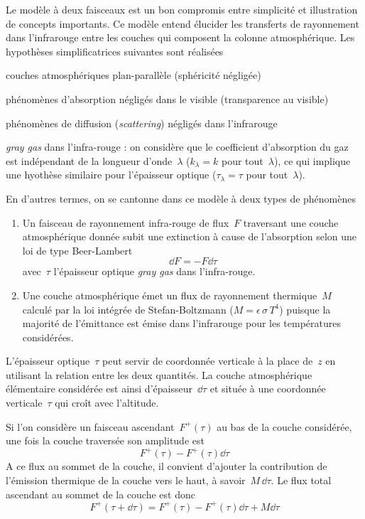 \sk
Le modèle à deux faisceaux est un bon compromis entre simplicité
et illustration de concepts importants. Ce modèle entend élucider
les transferts de rayonnement dans l'infrarouge entre
les couches qui composent la colonne atmosphérique. Les
hypothèses simplificatrices suivantes sont réalisées
\begin{citemize}
\item couches atmosphériques plan-parallèle (sphéricité négligée)
\item phénomènes d'absorption négligés dans le visible (transparence au visible)
\item phénomènes de diffusion (\emph{scattering}) négligés dans l'infrarouge
\item \emph{gray gas} dans l'infra-rouge : on considère que le coefficient d'absorption
du gaz est indépendant de la longueur d'onde~$\lambda$ ($k_{\lambda} = k$ pour tout~$\lambda$),
ce qui implique une hyothèse similaire pour l'épaisseur optique ($\tau_{\lambda} = \tau$ pour tout~$\lambda$).
\end{citemize}
En d'autres termes, on se cantonne dans ce modèle à deux types de phénomènes
\begin{enumerate}
\item Un faisceau de rayonnement infra-rouge de flux~$F$ traversant une couche 
atmosphérique donnée
subit une extinction à cause de l'absorption selon une loi de type Beer-Lambert
\[
\dd F = - F \dd \tau
\]
avec~$\tau$ l'épaisseur optique \emph{gray gas} 
dans l'infra-rouge.
\item Une couche atmosphérique émet un flux de rayonnement thermique~$M$ 
calculé par la loi intégrée de Stefan-Boltzmann ($M=\epsilon\,\sigma\,T^4$)
puisque la majorité de l'émittance est émise dans l'infrarouge pour les températures considérées.
\end{enumerate}

\sk
L'épaisseur optique~$\tau$ peut servir de coordonnée verticale à la place de~$z$
en utilisant la relation entre les deux quantités. La couche atmosphérique
élémentaire considérée est ainsi d'épaisseur~$\dd\tau$ et située à une coordonnée
verticale~$\tau$ qui croît avec l'altitude. 

\sk
Si l'on considère un faisceau ascendant~$F^+(\tau)$ au bas de la couche considérée,
une fois la couche traversée son amplitude est
\[
F^+(\tau) - F^+(\tau) \dd\tau
\]
A ce flux au sommet de la couche, il convient d'ajouter
la contribution de l'émission thermique de la couche vers 
le haut, à savoir~$M\,\dd\tau$.
Le flux total ascendant au sommet de la couche est donc
\[
F^+(\tau+\dd\tau) = F^+(\tau) - F^+(\tau) \dd\tau + M\dd\tau
\]

